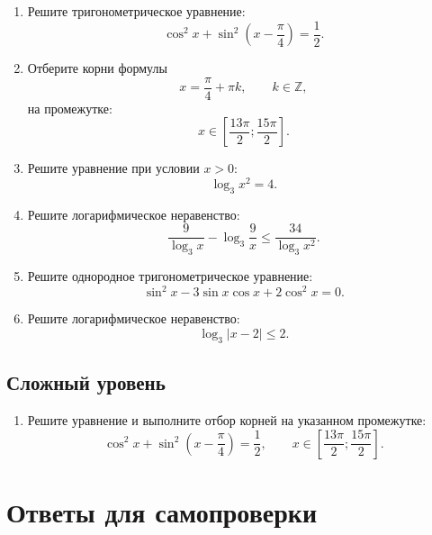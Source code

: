 \documentclass[a4paper,12pt]{article}
\begin{document}
\begin{enumerate}[resume]
    \item Решите тригонометрическое уравнение:
    \[
    \cos^2x+\sin^2\left(x-\frac{\pi}{4}\right)=\frac12.
    \]

    \item Отберите корни формулы
    \[
    x=\frac{\pi}{4}+\pi k,\qquad k\in\mathbb Z,
    \]
    на промежутке:
    \[
    x\in\left[\frac{13\pi}{2};\frac{15\pi}{2}\right].
    \]

    \item Решите уравнение при условии $x>0$:
    \[
    \log_3x^2=4.
    \]

    \item Решите логарифмическое неравенство:
    \[
    \frac{9}{\log_3x}-\log_3\frac{9}{x}
    \le
    \frac{34}{\log_3x^2}.
    \]

    \item Решите однородное тригонометрическое уравнение:
    \[
    \sin^2x-3\sin x\cos x+2\cos^2x=0.
    \]

    \item Решите логарифмическое неравенство:
    \[
    \log_3|x-2|\le2.
    \]
\end{enumerate}

\subsection*{Сложный уровень}

\begin{enumerate}[resume]
    \item Решите уравнение и выполните отбор корней на указанном промежутке:
    \[
    \cos^2x+\sin^2\left(x-\frac{\pi}{4}\right)=\frac12,
    \qquad
    x\in\left[\frac{13\pi}{2};\frac{15\pi}{2}\right].
    \]
\end{enumerate}

\newpage

\section*{Ответы для самопроверки}
\end{document}

